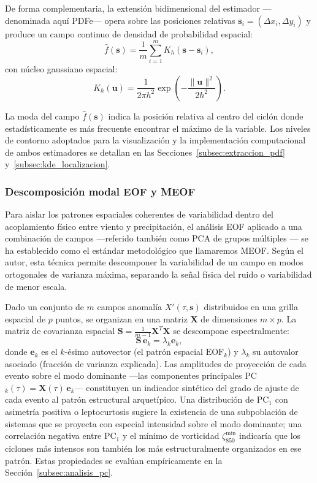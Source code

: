 De forma complementaria, la extensión bidimensional del estimador —denominada aquí PDFe— opera sobre las posiciones relativas $\mathbf{s}_i = (\Delta x_i, \Delta y_i)$ y produce un campo continuo de densidad de probabilidad espacial:
\begin{equation}\label{eq:tb_kde_simple}
\hat{f}(\mathbf{s}) = \frac{1}{m} \sum_{i=1}^{m} K_h(\mathbf{s} - \mathbf{s}_i),
\end{equation}
con núcleo gaussiano espacial:
\begin{equation}\label{eq:tb_gauss_kernel_2d_simple}
K_h(\mathbf{u}) = \frac{1}{2\pi h^2} \exp\!\left(-\frac{\|\mathbf{u}\|^2}{2h^2}\right).
\end{equation}

La moda del campo $\hat{f}(\mathbf{s})$ indica la posición relativa al centro del ciclón donde 
estadísticamente es más frecuente encontrar el máximo de la variable. 
Los niveles de contorno adoptados para la visualización y la implementación computacional de ambos estimadores se detallan en las Secciones~\ref{subsec:extraccion_pdf} y~\ref{subsec:kde_localizacion}.

\subsubsection{Descomposición modal EOF y MEOF}\label{subsubsec:tb_eof}
Para aislar los patrones espaciales coherentes de variabilidad dentro del acoplamiento físico entre viento y precipitación, el análisis EOF aplicado a una combinación de campos —referido también como PCA de grupos múltiples \citep{hannachi2007empirical}— se ha establecido como el estándar metodológico que llamaremos MEOF. Según el autor, esta técnica permite descomponer la variabilidad de un campo en modos ortogonales de varianza máxima, separando la señal física del ruido o variabilidad de menor escala.

Dado un conjunto de $m$ campos anomalía $X'(\tau, \mathbf{s})$ distribuidos en una grilla espacial de $p$ puntos, se organizan en una matriz $\mathbf{X}$ de dimensiones $m \times p$. La matriz de covarianza espacial $\mathbf{S} = \frac{1}{m-1}\mathbf{X}^T\mathbf{X}$ se descompone espectralmente:
\begin{equation}\label{eq:eof_decomp}
\mathbf{S}\,\mathbf{e}_k = \lambda_k \mathbf{e}_k,
\end{equation}
donde $\mathbf{e}_k$ es el $k$-ésimo autovector (el patrón espacial $\text{EOF}_k$) y $\lambda_k$ su autovalor asociado (fracción de varianza explicada). Las amplitudes de proyección de cada evento sobre el modo dominante —las componentes principales PC$_k(\tau) = \mathbf{X}(\tau)\,\mathbf{e}_k$— constituyen un indicador sintético del grado de ajuste de cada evento al patrón estructural arquetípico. Una distribución de PC$_1$ con asimetría positiva o leptocurtosis sugiere la existencia de una subpoblación de sistemas que se proyecta con especial intensidad sobre el modo dominante; una correlación negativa entre PC$_1$ y el mínimo de vorticidad $\zeta_{850}^{\min}$ indicaría que los ciclones más intensos son también los más estructuralmente organizados en ese patrón. Estas propiedades se evalúan empíricamente en la Sección~\ref{subsec:analisis_pc}.

